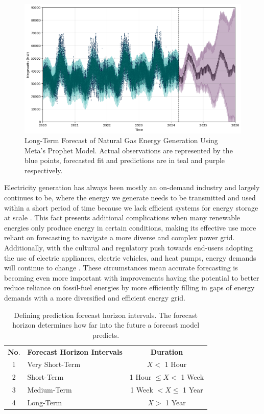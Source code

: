 \documentclass[sigconf]{acmart}
\begin{document}
  \begin{figure}[hbt!]
    \includegraphics[width=\columnwidth]{Images/Forecast.png}
    \caption{Long-Term Forecast of Natural Gas Energy Generation Using Meta's Prophet Model. Actual observations are represented by the blue points, forecasted fit and predictions are in teal and purple respectively.}
    \Description{}
    \label{fig:forecast}
  \end{figure}

Electricity generation has always been mostly an on-demand industry and largely continues to be, where the energy we generate needs to be transmitted and used within a short period of time because we lack efficient systems for energy storage at scale \cite{Lai21}. This fact presents additional complications when many renewable energies only produce energy in certain conditions, making its effective use more reliant on forecasting to navigate a more diverse and complex power grid. Additionally, with the cultural and regulatory push towards end-users adopting the use of electric appliances, electric vehicles, and heat pumps, energy demands will continue to change \cite{Archsmith22}. These circumstances mean accurate forecasting is becoming even more important with improvements having the potential to better reduce reliance on fossil-fuel energies by more efficiently filling in gaps of energy demands with a more diversified and efficient energy grid.

\begin{table}
\centering
\caption{Defining prediction forecast horizon intervals. The forecast horizon determines how far into the future a forecast model predicts.}
\begin{tabular}{clc}
\toprule
\hfill \textbf{No}. & \hfil \textbf{Forecast Horizon Intervals} & \textbf{Duration}\\
\cmidrule(lr){1-1}\cmidrule(rl){2-2}\cmidrule(rl){3-3}
  1 & Very Short-Term & $ X < $ 1 Hour \\
  2 & Short-Term  & 1 Hour $ \leq X < $ 1 Week  \\   
  3 & Medium-Term & 1 Week $ < X \leq $ 1 Year  \\   
  4 & Long-Term & $ X > $ 1 Year  \\ 
  \bottomrule
\end{tabular}
\end{table}
\end{document}

